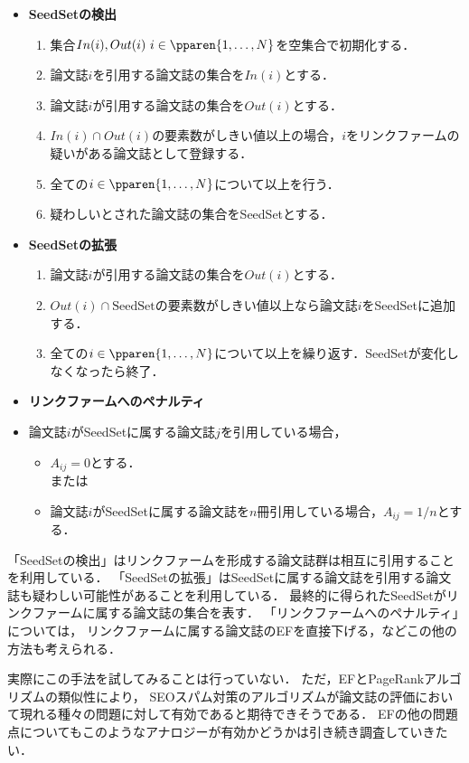 \begin{itemize}
    \item \textbf{SeedSetの検出}
    \begin{enumerate}
        \item 集合$In(i), Out(i)~i \in \pparen{1,\ldots,N}$を空集合で初期化する．
        \item 論文誌$i$を引用する論文誌の集合を$In(i)$とする．
        \item 論文誌$i$が引用する論文誌の集合を$Out(i)$とする．
        \item $In(i) \cap Out(i)$の要素数がしきい値以上の場合，$i$をリンクファームの疑いがある論文誌として登録する．
        \item 全ての$i \in \pparen{1,\ldots,N}$について以上を行う．
        \item 疑わしいとされた論文誌の集合をSeedSetとする．
    \end{enumerate}
    \item \textbf{SeedSetの拡張}
    \begin{enumerate}
        \item 論文誌$i$が引用する論文誌の集合を$Out(i)$とする．
        \item $Out(i) \cap \text{SeedSet}$の要素数がしきい値以上なら論文誌$i$をSeedSetに追加する．
        \item 全ての$i \in \pparen{1,\ldots,N}$について以上を繰り返す．SeedSetが変化しなくなったら終了．
    \end{enumerate}
    \item \textbf{リンクファームへのペナルティ} 
    \item[] 論文誌$i$がSeedSetに属する論文誌$j$を引用している場合，
    \begin{itemize}
        \item $A_{ij}=0$とする． \\または
        \item 論文誌$i$がSeedSetに属する論文誌を$n$冊引用している場合，$A_{ij}=1/n$とする．
    \end{itemize}
\end{itemize}
「SeedSetの検出」はリンクファームを形成する論文誌群は相互に引用することを利用している．
「SeedSetの拡張」はSeedSetに属する論文誌を引用する論文誌も疑わしい可能性があることを利用している．
最終的に得られたSeedSetがリンクファームに属する論文誌の集合を表す．
「リンクファームへのペナルティ」については，
リンクファームに属する論文誌のEFを直接下げる，などこの他の方法も考えられる．
\par
実際にこの手法を試してみることは行っていない．
ただ，EFとPageRankアルゴリズムの類似性により，
SEOスパム対策のアルゴリズムが論文誌の評価において現れる種々の問題に対して有効であると期待できそうである．
EFの他の問題点についてもこのようなアナロジーが有効かどうかは引き続き調査していきたい．

